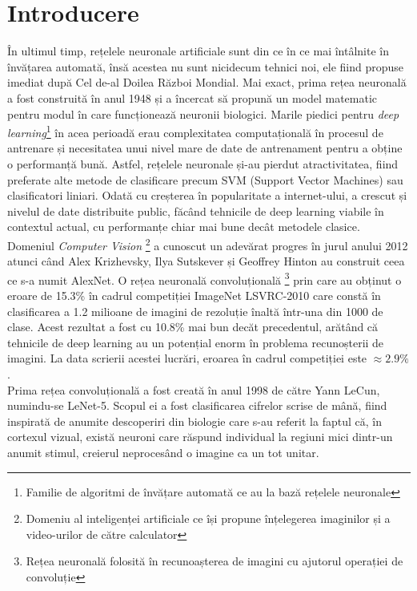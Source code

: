 \section*{Introducere}
În ultimul timp, rețelele neuronale artificiale sunt din ce în ce mai întâlnite în învățarea automată, însă acestea nu sunt nicidecum tehnici noi, ele fiind propuse imediat după Cel de-al Doilea Război Mondial. Mai exact, prima rețea neuronală a fost construită în anul 1948 și a încercat să propună un model matematic pentru modul în care funcționează neuronii biologici. Marile piedici pentru \textit{deep learning}\footnote{Familie de algoritmi de învățare automată ce au la bază rețelele neuronale} în acea perioadă erau complexitatea computațională în procesul de antrenare și necesitatea unui nivel mare de date de antrenament pentru a obține o performanță bună. Astfel, rețelele neuronale și-au pierdut atractivitatea, fiind preferate alte metode de clasificare precum SVM (Support Vector Machines) sau clasificatori liniari. Odată cu creșterea în popularitate a internet-ului, a crescut și nivelul de date distribuite public, făcând tehnicile de deep learning viabile în contextul actual, cu performanțe chiar mai bune decât metodele clasice.\\

Domeniul \textit{Computer Vision} \footnote{Domeniu al inteligenței artificiale ce își propune înțelegerea imaginilor și a video-urilor de către calculator} a cunoscut un adevărat progres în jurul anului 2012 atunci când Alex Krizhevsky, Ilya Sutskever și Geoffrey Hinton au construit ceea ce s-a numit AlexNet.\cite{alexnet} O rețea neuronală convoluțională \footnote{Rețea neuronală folosită în recunoașterea de imagini cu ajutorul operației de convoluție} prin care au obținut o eroare de 15.3\% în cadrul competiției ImageNet LSVRC-2010 care constă în clasificarea a 1.2 milioane de imagini de rezoluție înaltă într-una din 1000 de clase. Acest rezultat a fost cu 10.8\% mai bun decăt precedentul, arătând că tehnicile de deep learning au un potențial enorm în problema recunoșterii de imagini. La data scrierii acestei lucrări, eroarea în cadrul competiției este $\approx 2.9\%$.\\

Prima rețea convoluțională a fost creată în anul 1998 de către Yann LeCun, numindu-se LeNet-5.   \cite{lenet} Scopul ei a fost clasificarea cifrelor scrise de mână, fiind inspirată de anumite descoperiri din biologie care s-au referit la faptul că, în cortexul vizual, există neuroni care răspund individual la regiuni mici dintr-un anumit stimul, creierul neprocesând o imagine ca un tot unitar. \\


